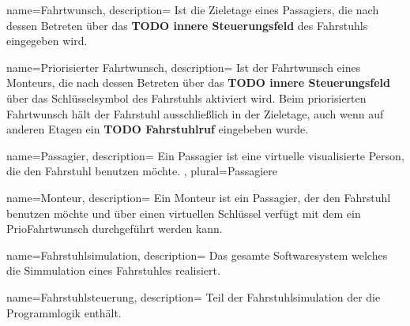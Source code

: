 {
	name=Fahrtwunsch,
	description={
				Ist die Zieletage eines \gls{Passagier}s, die nach dessen Betreten über das \textbf{TODO innere Steuerungsfeld} des Fahrstuhls eingegeben wird.
		}
}

{
	name=Priorisierter Fahrtwunsch,
	description={
		Ist der \gls{Fahrtwunsch} eines Monteurs, die nach dessen Betreten über das \textbf{TODO innere Steuerungsfeld} über das Schlüsselsymbol des Fahrstuhls aktiviert wird. Beim priorisierten Fahrtwunsch hält der Fahrstuhl ausschließlich in der Zieletage, auch wenn auf anderen Etagen ein \textbf{TODO Fahrstuhlruf} eingebeben wurde.
	}
}

{
	name=Passagier,
	description={
		Ein Passagier ist eine virtuelle visualisierte Person, die den Fahrstuhl benutzen möchte.
	},
	plural=Passagiere
}

{
	name=Monteur,
	description={
		Ein Monteur ist ein \gls{Passagier}, der den Fahrstuhl benutzen möchte und über einen virtuellen Schlüssel verfügt mit dem ein \gls{PrioFahrtwunsch}
		durchgeführt werden kann.
	}
}

{
	name=Fahrstuhlsimulation,
	description={
		Das gesamte Softwaresystem welches die Simmulation eines Fahrstuhles realisiert.
	}
}

{
	name=Fahrstuhlsteuerung,
	description={
		Teil der Fahrstuhlsimulation der die Programmlogik enthält.
	}
}

